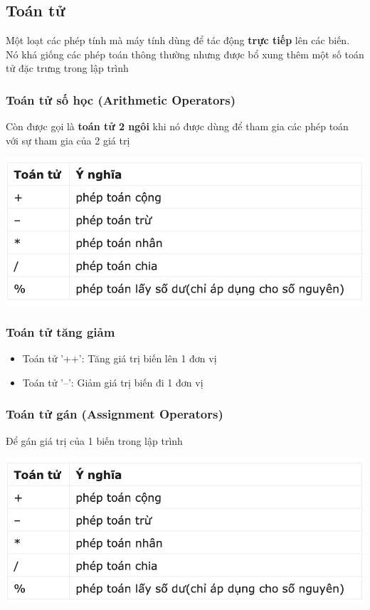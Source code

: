 \documentclass[12pt,a4paper]{article}
\begin{document}
\subsection{Toán tử}

Một loạt các phép tính mà máy tính dùng để tác động \textbf{trực tiếp} lên các biến. Nó khá giống các phép toán thông thường nhưng được bổ xung thêm một số toán tử đặc trưng trong lập trình
\subsubsection{Toán tử số học (Arithmetic Operators)}
Còn được gọi là \textbf{toán tử 2 ngôi} khi nó được dùng để tham gia các phép toán với sự tham gia của 2 giá trị
\begin{center}
	\includegraphics[scale =0.7]{ArithmeticOperators}
\end{center}
\subsubsection{Toán tử tăng giảm}
\begin{itemize}
	\item Toán tử '++': Tăng giá trị biến lên 1 đơn vị
	\item Toán tử '--': Giảm giá trị biến đi 1 đơn vị
\end{itemize}
\subsubsection{Toán tử gán (Assignment Operators)}
Để gán giá trị của 1 biến trong lập trình 
\begin{center}
	\includegraphics[scale =0.7]{ArithmeticOperators}
\end{center}
\end{document}
